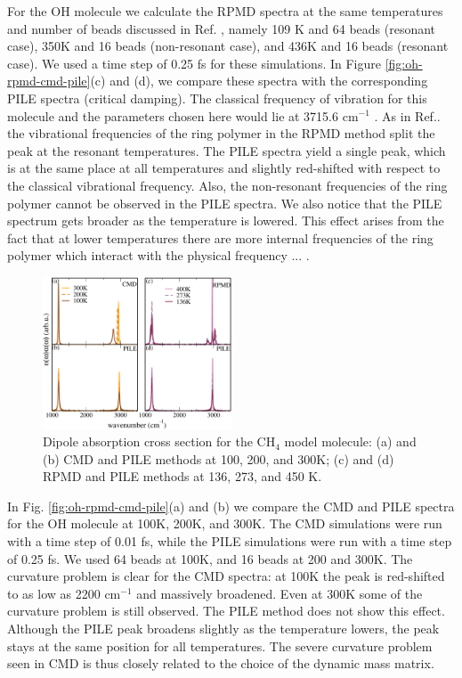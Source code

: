 \documentclass[aps,prb,superscriptaddress,amsmath,amssymb,showpacs,twocolumn]{revtex4}
\begin{document}
For the OH molecule we calculate the RPMD spectra at the same temperatures and number of beads discussed in Ref. \cite{witt+09jcp}, 
namely 109 K and 64 beads (resonant case), 350K and 16 beads (non-resonant case), and 436K and 16 beads (resonant case). We used a time
step of 0.25 fs for these simulations.
In Figure \ref{fig:oh-rpmd-cmd-pile}(c) and (d), we compare these spectra with the corresponding PILE spectra (critical damping).
The classical frequency of vibration for this molecule and the parameters chosen here
would lie at 3715.6 cm$^{-1}$ .
As in Ref.\cite{witt+09jcp}. the vibrational frequencies of the ring polymer in the RPMD method 
split the peak at the resonant temperatures. The PILE spectra yield a 
single peak, which is at the same place at all temperatures and slightly
red-shifted with respect to the classical vibrational frequency. Also, the non-resonant frequencies
of the ring polymer cannot be observed in the PILE spectra. We also notice that the PILE
spectrum gets broader as the temperature is lowered. This effect arises from the fact that at lower
temperatures there are more internal frequencies of the ring polymer which interact with the physical frequency ... .

\begin{figure}[htbp]
\centering
\includegraphics[width=0.5\textwidth]{figures/comparison_ch4_factors.pdf}
\caption{Dipole absorption cross section for the CH$_4$ model molecule: (a) and (b) CMD and PILE methods at 100, 200, and 300K; (c) and (d) RPMD and PILE methods at 136, 273, and 450 K.}
\label{fig:ch4-rpmd-cmd-pile}
\end{figure}

In Fig. \ref{fig:oh-rpmd-cmd-pile}(a) and (b) we compare the CMD and PILE spectra for the OH molecule
at 100K, 200K, and 300K. The CMD simulations were run with a time step of 0.01 fs, while the PILE simulations
were run with a time step of 0.25 fs. We used 64 beads at 100K, and 16 beads at 200 and 300K.
The curvature problem is clear for the CMD spectra: at 100K the peak is red-shifted to as low as 2200 cm$^{-1}$
and massively broadened. Even at 300K some of the curvature problem is still observed. The PILE method
does not show this effect. Although the PILE peak broadens slightly as the temperature
lowers, the peak stays at the same position for all temperatures. The severe curvature problem seen in CMD is thus
closely related to the choice of the dynamic mass matrix.
\end{document}
